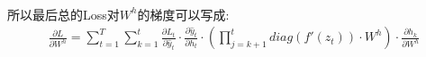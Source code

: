 \documentclass{article}
\begin{document}
\paragraph*{}
所以最后总的Loss对$W^h$的梯度可以写成:
\begin{align*}
    \frac{\partial L}{\partial W^h} = \sum_{t=1}^{T} \sum_{k=1}^{t} \frac{\partial L_t}{\partial \hat{y}_t}
    \cdot \frac{\partial \hat{y}_t}{\partial{h_t}}
    \cdot (\prod_{j=k+1}^{t} diag(f'(z_t)) \cdot W^h)
    \cdot \frac{\partial h_k}{\partial{W^h}}
\end{align*}
\end{document}
